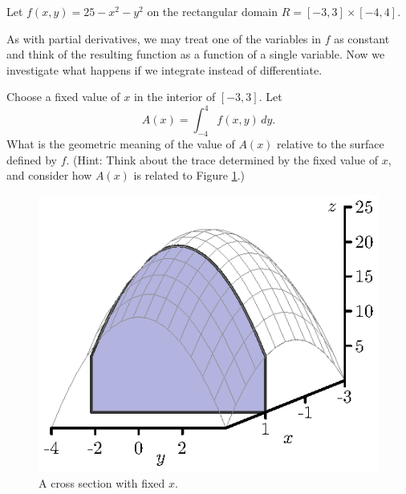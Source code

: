\begin{pa} \label{PA:11.2} Let $f(x,y) = 25-x^2-y^2$ on the rectangular domain $R = [-3,3] \times [-4,4]$.

As with partial derivatives, we may treat one of the variables in $f$ as constant and think of the resulting function as a function of a single variable. Now we investigate what happens if we integrate instead of differentiate.

	\ba
	\item  Choose a fixed value of $x$ in the interior of $[-3,3]$. Let
\[A(x) = \int_{-4}^4 f(x,y) \, dy.\]
What is the geometric meaning of the value of $A(x)$ relative to the surface defined by $f$. (Hint: Think about the trace determined by the fixed value of $x$, and consider how $A(x)$ is related to Figure \ref{F:11.2.Cross_section_PA_y}.)
\begin{figure}[ht]
\begin{center}
\begin{minipage}{2.5in}
\begin{center}
  \includegraphics{figures/fig_11_2_preview_slice.eps}
\end{center}
\caption{A cross section with fixed $x$.}
\label{F:11.2.Cross_section_PA_y}
\end{minipage} \hspace{0.2in}
\begin{minipage}{2.5in}
\begin{center}

\end{center}
\end{minipage}
\end{center}
\end{figure}
\end{pa}
